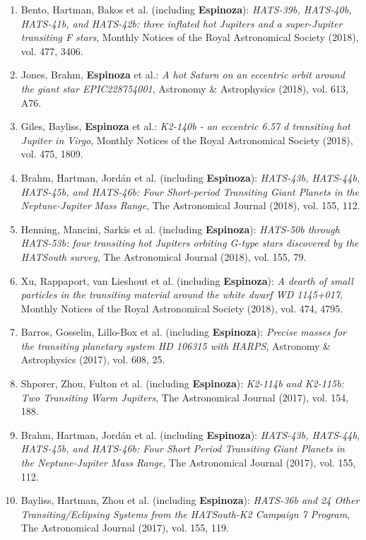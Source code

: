 \documentclass[12pt, a4paper]{article} %
\begin{document}
\begin{flushleft}
\begin{enumerate}
\item Bento, Hartman, Bakos et al. (including \textbf{Espinoza}): \textit{HATS-39b, HATS-40b, HATS-41b, and HATS-42b: three inflated hot Jupiters and a super-Jupiter transiting F stars},  Monthly Notices of the Royal Astronomical Society (2018), vol. 477, 3406.
\item Jones, Brahm, \textbf{Espinoza} et al.: \textit{A hot Saturn on an eccentric orbit around the giant star EPIC228754001},  Astronomy \& Astrophysics (2018), vol. 613, A76.
\item Giles, Bayliss, \textbf{Espinoza} et al.: \textit{K2-140b - an eccentric 6.57 d transiting hot Jupiter in Virgo}, 
Monthly Notices of the Royal Astronomical Society (2018), vol. 475, 1809.
\item Brahm, Hartman, Jord\'an et al. (including \textbf{Espinoza}): \textit{	HATS-43b, HATS-44b, HATS-45b, and HATS-46b: Four Short-period Transiting Giant Planets in the Neptune-Jupiter Mass Range}, The Astronomical Journal (2018), vol. 155, 112.
\item Henning, Mancini, Sarkis et al. (including \textbf{Espinoza}): \textit{HATS-50b through HATS-53b: four transiting hot Jupiters orbiting G-type stars discovered by the HATSouth survey}, The Astronomical Journal (2018), vol. 155, 79.
\item Xu, Rappaport, van Lieshout et al. (including \textbf{Espinoza}): \textit{A dearth of small particles in the transiting material around the white dwarf WD 1145+017}, Monthly Notices of the Royal Astronomical Society (2018), vol. 474, 4795.
\item Barros, Gosselin, Lillo-Box et al. (including \textbf{Espinoza}): \textit{Precise masses for the transiting planetary system HD 106315 with HARPS}, Astronomy \& Astrophysics (2017), vol. 608, 25.
\item Shporer, Zhou, Fulton et al. (including \textbf{Espinoza}): \textit{K2-114b and K2-115b: Two Transiting Warm Jupiters}, The Astronomical Journal (2017), vol. 154, 188.
\item Brahm, Hartman, Jord\'an et al. (including \textbf{Espinoza}): \textit{HATS-43b, HATS-44b, HATS-45b, and HATS-46b: Four Short Period Transiting Giant Planets in the Neptune-Jupiter Mass Range}, The Astronomical Journal (2017), vol. 155, 112.
\item Bayliss, Hartman, Zhou et al. (including \textbf{Espinoza}): \textit{HATS-36b and 24 Other Transiting/Eclipsing Systems from the HATSouth-K2 Campaign 7 Program}, The Astronomical Journal (2017), vol. 155, 119.

\end{enumerate}
\end{flushleft}
\end{document}
